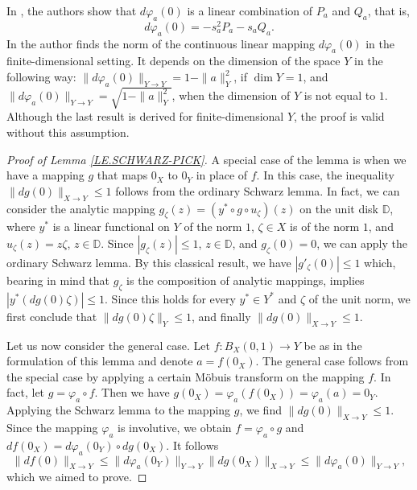 \documentclass{amsart}
\theoremstyle{definition}
\numberwithin{equation}{section}
\begin{document}
In \cite[Lemma 3.2]{BLASCO.JFA}, the authors show that $d\varphi_a (0)$ is a linear combination of $P_a$ and $Q_a$,
that is,
\begin{equation*}
d \varphi_a (0) = - s_a^2P_a - s_a Q_a.
\end{equation*}
In \cite[Lemma 2.2]{KALAJ.GJM} the author finds the norm of the continuous linear mapping $d\varphi_a (0)$ in the
finite-dimensional setting. It depends on the dimension of the space $Y$ in the following way:
$\|d \varphi_a (0)\|_{Y\to Y} = 1 - \|a\|_Y^2$, if $\dim Y = 1$, and $\|d \varphi_a (0)\|_{Y\to Y} = \sqrt{1-\|a\|^2_Y}$,
when the dimension of $Y$ is not equal to $1$. Although the last result is derived for finite-dimensional $Y$, the
proof is valid without this assumption.

\begin{proof}[Proof of Lemma \ref{LE.SCHWARZ-PICK}]
A special case of the lemma is when we have a mapping $g$ that maps $0_X$ to $0_Y$ in place of $f$. In this case, the
inequality $\|dg(0)\|_{X\to Y} \le  1$ follows from the ordinary Schwarz lemma. In fact, we can consider the analytic
mapping $g_\zeta (z) = (y^\ast\circ  g\circ u_\zeta )(z)$ on the unit disk $\mathbb{D}$, where $y^\ast$ is a linear
functional on $Y$ of the norm $1$, $\zeta\in X$ is of the norm $1$, and $u_\zeta (z) = z \zeta$, $z\in \mathbb{D}$.
Since $|g_\zeta (z)|\le 1$, $z\in \mathbb{D}$, and $g_\zeta (0) = 0$, we can apply the ordinary Schwarz lemma. By this
classical result, we have $|g'_\zeta (0)|\le 1$ which, bearing in mind that $g_\zeta$ is the composition of analytic
mappings, implies $|y^\ast ( dg (0)\zeta ) |\le 1$. Since this holds for every $y^\ast\in Y^\ast$ and $\zeta$ of the
unit norm, we first conclude that $\|dg (0)\zeta\|_Y\le 1$, and finally $\|dg(0)\|_{X\to Y}\le 1$.

Let us now consider the general case. Let $f:B_X(0,1)\to Y$ be as in the formulation of this lemma and denote
$a = f(0_X)$. The general case follows from the special case by applying a certain M\"{o}buis transform on the
mapping $f$. In fact, let $g   = \varphi _a \circ f$. Then we have $g(0_X) = \varphi_a(f(0_X)) = \varphi_a (a) = 0_Y$.
Applying the Schwarz lemma to the mapping $g$, we find $\|dg (0)\|_{X\to Y} \le 1$. Since the mapping $\varphi_a$
is involutive, we obtain $f = \varphi _a \circ g$ and $df(0_X) = d\varphi _a(0_Y) \circ dg(0_X)$. It follows
\begin{equation*}
\|df(0)\|_{X\to Y} \le \|d\varphi _a(0_Y) \|_{Y\to Y}  \|dg(0_X)\| _{X\to Y} \le \|d\varphi _a(0) \|_{Y\to Y},
\end{equation*}
which we aimed to prove.
\end{proof}
\end{document}
